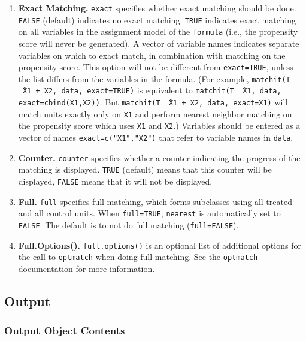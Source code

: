 \documentclass[oneside,letterpaper,titlepage]{article}
\begin{document}
\begin{enumerate}
\item \textbf{Exact Matching.}  \texttt{exact} specifies whether exact
  matching should be done.  \texttt{FALSE} (default) indicates no
  exact matching.  \texttt{TRUE} indicates exact matching on all
  variables in the assignment model of the \texttt{formula} (i.e., the
  propensity score will never be generated).  A vector of variable
  names indicates separate variables on which to exact match, in
  combination with matching on the propensity score.  This option will
  not be different from \texttt{exact=TRUE}, unless the list differs
  from the variables in the formula.  (For example, \texttt{matchit(T
    \~\ X1 + X2, data, exact=TRUE)} is equivalent to \texttt{matchit(T
    \~\ X1, data, exact=cbind(X1,X2))}.  But \texttt{matchit(T \~\ X1
    + X2, data, exact=X1)} will match units exactly only on
  \texttt{X1} and perform nearest neighbor matching on the propensity
  score which uses \texttt{X1} and \texttt{X2}.)  Variables should be
  entered as a vector of names \texttt{exact=c("X1","X2")} that refer
  to variable names in \texttt{data}.
  
\item \textbf{Counter.} \texttt{counter} specifies whether a counter
  indicating the progress of the matching is displayed.  \texttt{TRUE}
  (default) means that this counter will be displayed, \texttt{FALSE}
  means that it will not be displayed.
  
\item \textbf{Full.}  \texttt{full} specifies full matching, which
  forms subclasses using all treated and all control units.  When
  \texttt{full=TRUE}, \texttt{nearest} is automatically set to
  \texttt{FALSE}.  The default is to not do full matching
  (\texttt{full=FALSE}).
  
\item \textbf{Full.Options().}  \texttt{full.options()} is an optional
  list of additional options for the call to \texttt{optmatch} when
  doing full matching.  See the \texttt{optmatch} documentation for
  more information.

\end{enumerate}
  
\subsection{Output}

\subsubsection{Output Object Contents}
\end{document}
